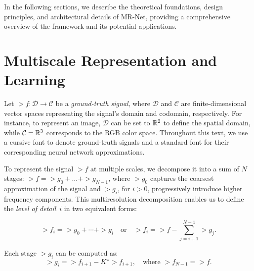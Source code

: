 In the following sections, we describe the theoretical foundations, design principles, and architectural details of MR-Net, providing a comprehensive overview of the framework and its potential applications.

\section{Multiscale Representation and Learning}
\label{s-motivation}


Let $\gt{f}:\mathcal{D}\to \mathcal{C}$ be a \textit{ground-truth signal}, where $\mathcal{D}$ and $\mathcal{C}$ are finite-dimensional vector spaces representing the signal's domain and codomain, respectively. For instance, to represent an image, $\mathcal{D}$ can be set to $\mathbb{R}^2$ to define the spatial domain, while $\mathcal{C}=\mathbb{R}^3$ corresponds to the RGB color space. Throughout this text, we use a cursive font to denote ground-truth signals and a standard font for their corresponding neural network approximations.

To represent the signal $\gt{f}$ at multiple scales, we decompose it into a sum of $N$ stages: $\gt{f}=\gt{g}_0+\dots+\gt{g}_{N-1}$, where $\gt{g}_0$ captures the coarsest approximation of the signal and $\gt{g}_i$, for $i>0$, progressively introduce higher frequency components. This multiresolution decomposition enables us to define the \textit{level of detail}~$i$ in two equivalent forms:

\begin{equation}
\gt{f}_i = \gt{g}_0 + \cdots + \gt{g}_i \quad \text{or} \quad \gt{f}_i = \gt{f} - \sum_{j=i+1}^{N-1} \gt{g}_j.
\end{equation}

Each stage $\gt{g}_i$ can be computed as:
\begin{equation}
\gt{g}_i = \gt{f}_{i+1} - K * \gt{f}_{i+1}, \quad \text{where } \gt{f}_{N-1} = \gt{f}.
\end{equation}

